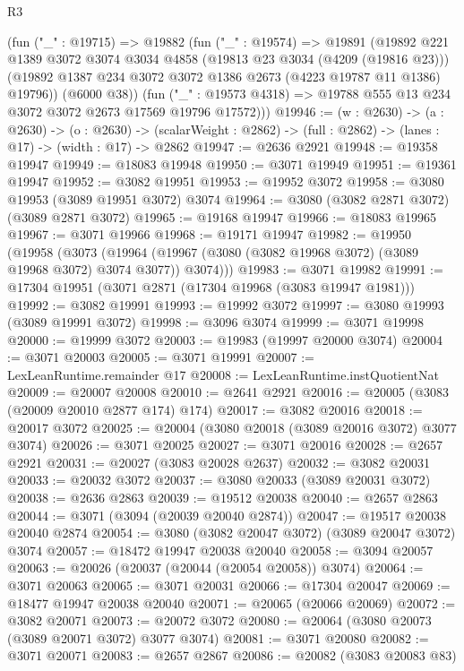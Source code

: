 \begin{lexlean}{R3}
\begin{coremodule}
      (fun ("_" : @19715) =>
      @19882
        (fun ("_" : @19574) =>
        @19891
          (@19892
            @221
            @1389
            @3072
            @3074
            @3034
            @4858
            (@19813 @23 @3034 (@4209 (@19816 @23)))
            (@19892 @1387 @234 @3072 @3072 @1386 @2673 (@4223 @19787 @11 @1386) @19796))
          (@6000 @38))
        (fun ("_" : @19573 @4318) => @19788 @555 @13 @234 @3072 @3072 @2673 @17569 @19796 @17572)))
@19946 := (w : @2630) ->
  (a : @2630) ->
  (o : @2630) -> (scalarWeight : @2862) -> (full : @2862) -> (lanes : @17) -> (width : @17) -> @2862
@19947 := @2636 @2921
@19948 := @19358 @19947
@19949 := @18083 @19948
@19950 := @3071 @19949
@19951 := @19361 @19947
@19952 := @3082 @19951
@19953 := @19952 @3072
@19958 := @3080 @19953 (@3089 @19951 @3072) @3074
@19964 := @3080 (@3082 @2871 @3072) (@3089 @2871 @3072)
@19965 := @19168 @19947
@19966 := @18083 @19965
@19967 := @3071 @19966
@19968 := @19171 @19947
@19982 := @19950
    (@19958
      (@3073 (@19964 (@19967 (@3080 (@3082 @19968 @3072) (@3089 @19968 @3072) @3074 @3077)) @3074)))
@19983 := @3071 @19982
@19991 := @17304 @19951 (@3071 @2871 (@17304 @19968 (@3083 @19947 @1981)))
@19992 := @3082 @19991
@19993 := @19992 @3072
@19997 := @3080 @19993 (@3089 @19991 @3072)
@19998 := @3096 @3074
@19999 := @3071 @19998
@20000 := @19999 @3072
@20003 := @19983 (@19997 @20000 @3074)
@20004 := @3071 @20003
@20005 := @3071 @19991
@20007 := LexLeanRuntime.remainder @17
@20008 := LexLeanRuntime.instQuotientNat
@20009 := @20007 @20008
@20010 := @2641 @2921
@20016 := @20005 (@3083 (@20009 @20010 @2877 @174) @174)
@20017 := @3082 @20016
@20018 := @20017 @3072
@20025 := @20004 (@3080 @20018 (@3089 @20016 @3072) @3077 @3074)
@20026 := @3071 @20025
@20027 := @3071 @20016
@20028 := @2657 @2921
@20031 := @20027 (@3083 @20028 @2637)
@20032 := @3082 @20031
@20033 := @20032 @3072
@20037 := @3080 @20033 (@3089 @20031 @3072)
@20038 := @2636 @2863
@20039 := @19512 @20038
@20040 := @2657 @2863
@20044 := @3071 (@3094 (@20039 @20040 @2874))
@20047 := @19517 @20038 @20040 @2874
@20054 := @3080 (@3082 @20047 @3072) (@3089 @20047 @3072) @3074
@20057 := @18472 @19947 @20038 @20040
@20058 := @3094 @20057
@20063 := @20026 (@20037 (@20044 (@20054 @20058)) @3074)
@20064 := @3071 @20063
@20065 := @3071 @20031
@20066 := @17304 @20047
@20069 := @18477 @19947 @20038 @20040
@20071 := @20065 (@20066 @20069)
@20072 := @3082 @20071
@20073 := @20072 @3072
@20080 := @20064 (@3080 @20073 (@3089 @20071 @3072) @3077 @3074)
@20081 := @3071 @20080
@20082 := @3071 @20071
@20083 := @2657 @2867
@20086 := @20082 (@3083 @20083 @83)

\end{coremodule}
\end{lexlean}
